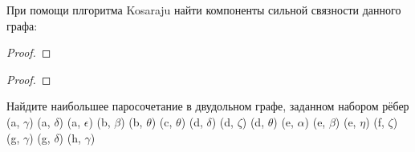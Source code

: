 

\begin{problem} При помощи плгоритма Kosaraju найти компоненты сильной связности данного графа:\\
    \begin{center}
    \end{center}
\end{problem}



\begin{problem}
\end{problem}
\begin{proof}
\end{proof}

\begin{problem}
\end{problem}
\begin{proof}
\end{proof}

\begin{problem}
Найдите наибольшее паросочетание в двудольном графе, заданном набором рёбер (a, $\gamma$) (a, $\delta$) (a, $\epsilon$) (b, $\beta$) (b, $\theta$) (c, $\theta$) (d, $\delta$) (d, $\zeta$) (d, $\theta$) (e, $\alpha$) (e, $\beta$) (e, $\eta$) (f, $\zeta$) (g, $\gamma$) (g, $\delta$) (h, $\gamma$)
\end{problem}

